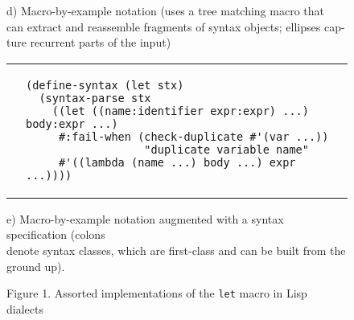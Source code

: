 \documentclass[10pt,journal,a4paper]{IEEEtran}
\begin{document}
\begin{figure*}[t]
\begin{listing}
\begin{adjustwidth}{4cm}{0pt}
d) Macro-by-example notation \cite{kohlbecker87} (uses a tree matching macro that\\
can extract and reassemble fragments of syntax objects; ellipses cap-\\ture
recurrent parts of the input)
\end{adjustwidth}

\begin{tabular}{p{2.5cm} p{14.5cm}}\\
 &
\begin{verbatim}
(define-syntax (let stx)
  (syntax-parse stx
    ((let ((name:identifier expr:expr) ...) body:expr ...)
     #:fail-when (check-duplicate #'(var ...))
                  "duplicate variable name"
     #'((lambda (name ...) body ...) expr ...))))
\end{verbatim}
\end{tabular}

\begin{adjustwidth}{3.2cm}{0pt}
e) Macro-by-example notation augmented with a syntax specification \cite{culpepper10}
(colons \\denote syntax classes, which are first-class and can be built from the ground up).
\end{adjustwidth}
\end{listing}
\end{figure*}

\begin{figure*}
\hskip3.95cm
\normalsize Figure 1. Assorted implementations of the \texttt{let} macro in Lisp dialects
\end{figure*}
\end{document}
